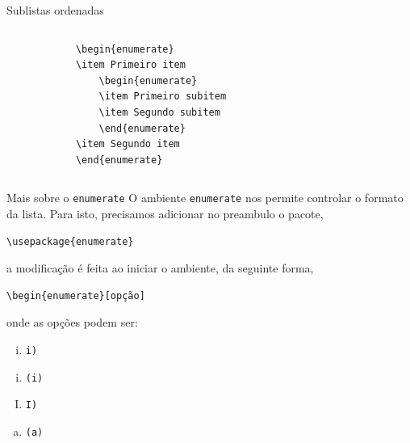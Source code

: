 \documentclass[c]{beamer}
\begin{document}
{\begin{frame}[fragile]{\sc Sublistas ordenadas}
\begin{columns}
		\begin{column}[t]{0.5\textwidth}			
			\begin{verbatim}
			\begin{enumerate}
			\item Primeiro item
				\begin{enumerate}
				\item Primeiro subitem
				\item Segundo subitem
				\end{enumerate}
			\item Segundo item
			\end{enumerate}
			\end{verbatim}
		\end{column}
	\end{columns}
	
\end{frame}

\begin{frame}[fragile]{\sc Mais sobre o \texttt{enumerate}}
	O ambiente \texttt{enumerate} nos permite controlar o 
	{\color{blue} formato da lista}. 
	Para isto, precisamos adicionar no preambulo o pacote,
\begin{verbatim}
\usepackage{enumerate}
\end{verbatim}	
	a modificação é feita ao iniciar o ambiente, da seguinte forma,
\begin{verbatim}
\begin{enumerate}[opção]
\end{verbatim}	
onde as opções podem ser:
	\begin{enumerate}[i)]
		\item \verb|i)|
	\end{enumerate}
	\begin{enumerate}[(i)]
		\item \verb|(i)|
	\end{enumerate}
	\begin{enumerate}[I)]
		\item \verb|I)|
	\end{enumerate}
	\begin{enumerate}[(a)]
		\item \verb|(a)|
	\end{enumerate}
\end{frame}

}
\end{document}
